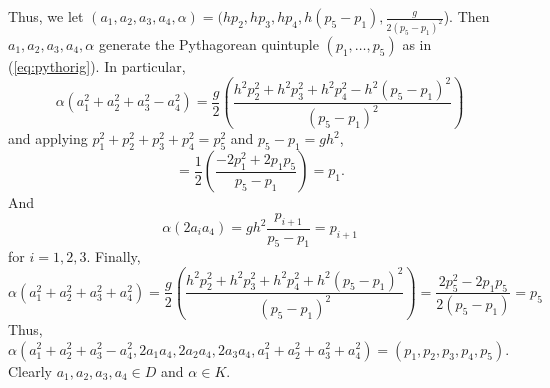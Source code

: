 Thus, we let $(a_1,a_2,a_3,a_4,\alpha) = 
(hp_2, hp_3, hp_4, h(p_5 - p_1), \frac{g}{2(p_5 - p_1)^2}$).
Then $a_1,a_2,a_3,a_4,\alpha$ generate the Pythagorean quintuple 
$(p_1,\ldots,p_5)$ as in (\ref{eq:pythorig}).
In particular,
\[
\alpha (a_1^2 + a_2^2 + a_3^2 - a_4^2)
= \frac{g}{2} 
  (\frac{h^2p_2^2 + h^2p_3^2 + h^2p_4^2 - h^2(p_5 - p_1)^2}{(p_5-p_1)^2})
\]
and applying $p_1^2 + p_2^2 + p_3^2 + p_4^2 = p_5^2$ and $p_5 - p_1 = gh^2$,
\[
= \frac{1}{2} (\frac{-2p_1^2 + 2p_1p_5}{p_5 - p_1}) = p_1.
\]
And
\[
\alpha (2a_i a_4) = gh^2 \frac{p_{i+1}}{p_5 - p_1} = p_{i+1}
\]
for $i=1,2,3$.
Finally, 
\[
\alpha(a_1^2 + a_2^2 + a_3^2 + a_4^2)
= \frac{g}{2} 
  (\frac{h^2p_2^2 + h^2p_3^2 + h^2p_4^2 + h^2(p_5 - p_1)^2}{(p_5-p_1)^2})
= \frac{2p_5^2 - 2p_1p_5}{2(p_5-p_1)} = p_5
\]
Thus, $\alpha (a_1^2 + a_2^2 + a_3^2 - a_4^2, 2a_1a_4, 2a_2a_4, 2a_3a_4, 
a_1^2 + a_2^2 + a_3^2 + a_4^2) = (p_1,p_2,p_3,p_4,p_5)$.
Clearly $a_1,a_2,a_3,a_4 \in D$ and $\alpha \in K$.
\QED
\fi




